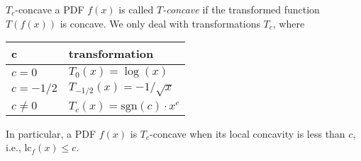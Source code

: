 \begin{labeling}[~--~]{\hspace{5em}}
\item[$T_c$-concave]
  a PDF $f(x)$ is called \emph{$T$-concave} if the transformed function
  $T(f(x))$ is concave. 
  We only deal with transformations $T_c$, where
  \begin{center}
    \begin{tabular}{l|l}
      c         & transformation \\
      \hline
      $c=0$     & $T_0(x) = \log(x)$ \\
      $c=-1/2$  & $T_{-1/2}(x) = -1/\sqrt{x}$ \\
      $c\not=0$ & $T_c(x) = \mathrm{sgn}(c) \cdot x^c$ \\
    \end{tabular}
  \end{center}
  In particular, a PDF $f(x)$ is $T_c$-concave when its local
  concavity is less than $c$, i.e.,
  $\mathrm{lc}_f(x) \leq c$.

\end{labeling}


